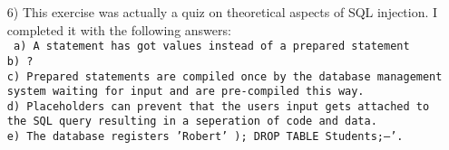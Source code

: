 \documentclass{article}
\begin{document}
\begin{itemize}
    \item[6)] {This exercise was actually a quiz on theoretical aspects of SQL injection. I completed it with the following answers:\\
    \texttt{
    a) A statement has got values instead of a prepared statement\\
    b) ?\\
    c) Prepared statements are compiled once by the database management system waiting for input and are pre-compiled this way.\\
    d) Placeholders can prevent that the users input gets attached to the SQL query resulting in a seperation of code and data.\\
    e) The database registers 'Robert' ); DROP TABLE Students;--'.}
    }
\end{itemize}
\end{document}
